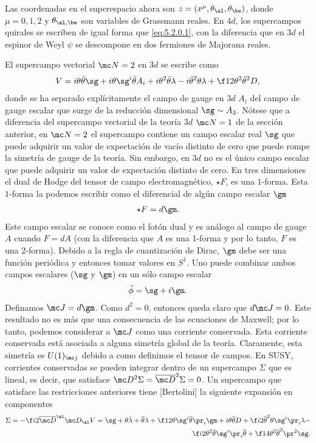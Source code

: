 Las coordenadas en el superespacio ahora son $z = (x^\mu,\theta_\al,\theta_\be)$, donde $\mu=0,1,2$ y $\theta_{\al,\be}$ son variables de Grassmann reales. En $4d$, los supercampos quirales se escriben de igual forma que \eqref{eq:5.2.0.1}, con la diferencia que en $3d$ el espinor de Weyl $\psi$ se descompone en dos fermiones de Majorana reales.

El supercampo vectorial $\mc N=2$ en $3d$ se escribe como
\begin{align}
	V = i\theta\bar\theta\sg+i\theta\sg^i\bar\theta A_i+i\theta^2\bar\theta\lambda-i\bar\theta^2\theta\lambda+\f 12\theta^2\bar\theta^2 D, \label{eq:5.2.1.2}
\end{align}
donde se ha separado explícitamente el campo de gauge en $3d$ $A_i$ del campo de gauge escalar que surge de la reducción dimensional $\sg\sim A_3$. Nótese que a diferencia del supercampo vectorial de la teoría $3d$ $\mc N=1$ de la sección anterior, en $\mc N=2$ el supercampo contiene un campo escalar real $\sg$ que puede adquirir un valor de expectación de vacío distinto de cero que puede rompe la simetría de gauge de la teoría. Sin embargo, en $3d$ no es el único campo escalar que puede adquirir un valor de expectación distinto de cero. En tres dimensiones el dual de Hodge del tensor de campo electromagnético, $\star F$, es una $1$-forma. Esta $1$-forma la podemos escribir como el diferencial de algún campo escalar $\gm$
\begin{align}
	\star F = d\gm.
\end{align}
Este campo escalar se conoce como el fotón dual y es análogo al campo de gauge $A$ cuando $F=dA$ (con la diferencia que $A$ es una 1-forma y por lo tanto, $F$ es una 2-forma). Debido a la regla de cuantización de Dirac, $\gm$ debe ser una función periódica y entonces tomar valores en $S^1$. Uno puede combinar ambos campos escalares ($\sg$ y $\gm$) en un sólo campo escalar
\begin{align}
	\tilde\phi = \sg+i\gm.
\end{align}
Definamos $\mc J = d\gm$. Como $d^2=0$, entonces queda claro que $d\mc J=0$. Este resultado no es más que una consecuencia de las ecuaciones de Maxwell; por lo tanto, podemos considerar a $\mc J$ como una corriente conservada. Esta corriente conservada está asociada a alguna simetría global de la teoría. Claramente, esta simetría es $U(1)_{\mc j}$ debido a como definimos el tensor de campos. En SUSY, corrientes conservadas se pueden integrar dentro de un supercampo $\Sigma$ que es lineal, es decir, que satisface $\mc D^2\Sigma=\overline{\mc D}^2\Sigma=0$. Un supercampo que satisface las restricciones anteriores tiene [Bertolini] la siguiente expansión en componentes
\begin{align}
	\Sigma = -\f i2\overline{\mc D}^\al\mc D_\al V = \sg+\theta\bar\lambda+\overline\theta\lambda+\f 12\theta\sg^i\overline\theta\pr_i\gm+i\theta\overline\theta D+\f i2\overline\theta^2\theta\sg^i\pr_i\lambda-\nonumber\\
	\f i2\theta^2\overline\theta\sg^i\pr_i\overline\theta+\f 14\theta^2\overline\theta^2\pr^2\sg.
\end{align}


